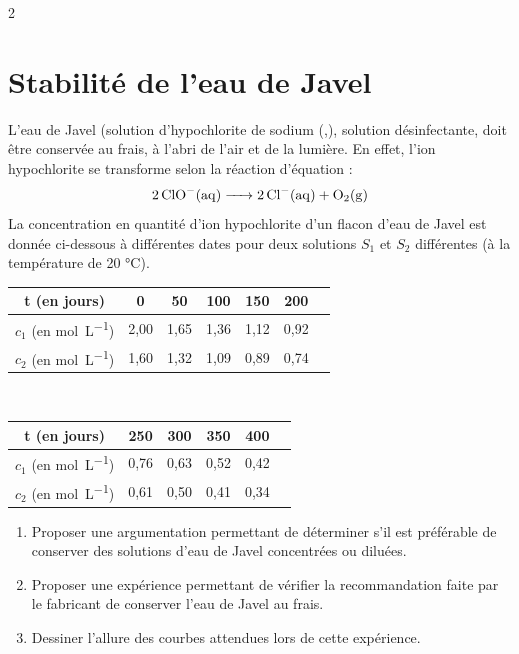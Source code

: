\documentclass[a4paper,11pt,fleqn]{article}%
\begin{document}
\begin{multicols}{2}
\section{Stabilité de l'eau de Javel}
L'eau de Javel (solution d'hypochlorite de sodium (,), solution désinfectante, doit être conservée au frais, à l'abri de l'air et de la lumière. En effet, l'ion hypochlorite se transforme selon la réaction d'équation :
\begin{eqnarray}
    \ce{2ClO-(aq) -> 2Cl-(aq) + O2(g)}\nonumber
\end{eqnarray}
La concentration en quantité d'ion hypochlorite d'un flacon d'eau de Javel est donnée ci-dessous à différentes dates pour deux solutions $S_1$ et $S_2$ différentes (à la température de \num{20} \unit{\celsius}).
\\
    \begin{tabular}{|c|c|c|c|c|c|c|}
    \hline t (en jours) & 0 & 50 & 100 & 150 & 200 \\
    \hline $c_1$ (en \unit{\mole\per\liter}) & 2,00 & 1,65 & 1,36 & 1,12 & 0,92\\
    \hline $c_2$ (en \unit{\mole\per\liter}) & 1,60 & 1,32 & 1,09 & 0,89 & 0,74\\
    \hline
    \end{tabular}\\
\noindent
    \begin{tabular}{|c|c|c|c|c|c|}
    \hline t (en jours) & 250 & 300 & 350 & 400\\
    \hline $c_1$ (en \unit{\mole\per\liter}) & 0,76 & 0,63 & 0,52 & 0,42\\
    \hline $c_2$ (en \unit{\mole\per\liter}) & 0,61 & 0,50 & 0,41 & 0,34\\
    \hline
    \end{tabular}
\begin{enumerate}
    \item Proposer une argumentation permettant de déterminer s'il est préférable de conserver des solutions d'eau de Javel concentrées ou diluées.
    \item Proposer une expérience permettant de vérifier la recommandation faite par le fabricant de conserver l'eau de Javel au frais.
    \item Dessiner l'allure des courbes attendues lors de cette expérience.
\end{enumerate}


\end{multicols}
\end{document}
